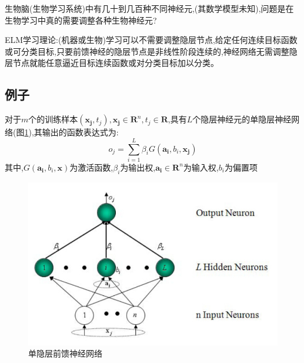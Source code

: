\documentclass[UTF8,a4paper]{ctexart}%
\begin{document}
              生物脑(生物学习系统)中有几十到几百种不同神经元,(其数学模型未知),问题是在生物学习中真的需要调整各种生物神经元?

              ELM学习理论:(机器或生物)学习可以不需要调整隐层节点,给定任何连续目标函数或可分类目标,只要前馈神经的隐层节点是非线性阶段连续的,神经网络无需调整隐层节点就能任意逼近目标连续函数或对分类目标加以分类。

      \subsection{例子}
          对于$m$个的训练样本$(\boldsymbol{x_j},t_j),\boldsymbol{x_j}\in\mathbf{ R }^n,t_j\in\mathbf{ R }$,具有$L$个隐层神经元的单隐层神经网络(图\ref{fig1}),其输出的函数表达式为:
          \begin{equation}
            o_j = \sum_{i = 1}^L \beta_iG(\boldsymbol{ a_i },b_i,\boldsymbol{x_j})
          \end{equation}
          其中,$G(\boldsymbol{a_i},b_i,\boldsymbol{x})$为激活函数,$\beta_i$为输出权,$\boldsymbol{a_i}\in \mathbf{R}^n$为输入权,$b_i$为偏置项
          \begin{figure}[htbp]
            \centering
            \includegraphics[scale=0.3]{assets/jiqixuexi3_a8b55.png}
            \caption{单隐层前馈神经网络}
            \label{fig1}
          \end{figure}
\end{document}

